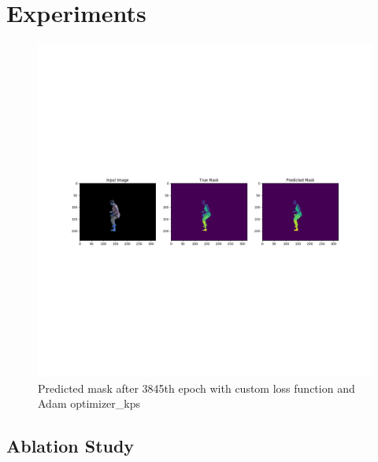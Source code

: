 

\chapter{Experiments} %

\label{Experiments} %

\begin{figure}[H]
    \centering
    \includegraphics[width=\textwidth, height=\textheight, keepaspectratio]{img/adam_prediction_3845_train.png}
    \decoRule
    \caption[Predicted Mask]{Predicted mask after 3845th epoch with custom loss function and Adam optimizer\_kps}
    \label{fig:adam-prediction}
\end{figure}


\section{Ablation Study}


